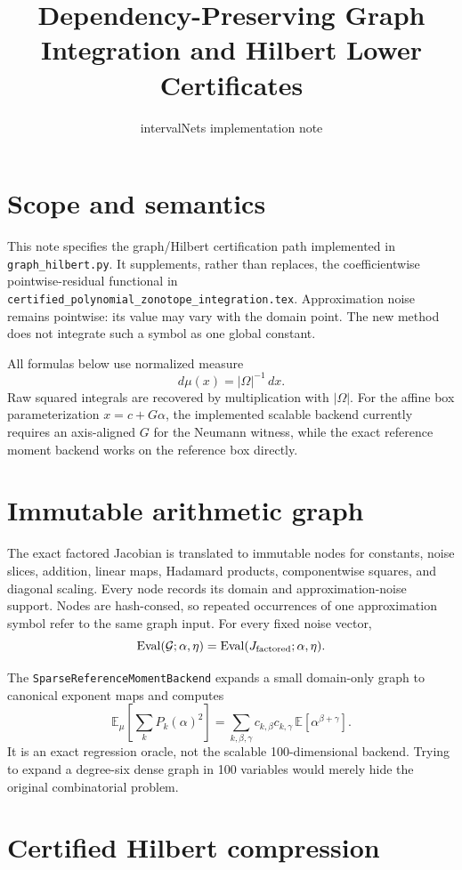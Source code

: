 \documentclass[11pt]{article}
\title{Dependency-Preserving Graph Integration and Hilbert Lower Certificates}
\author{intervalNets implementation note}
\date{}
\begin{document}
\maketitle

\section{Scope and semantics}

This note specifies the graph/Hilbert certification path implemented in
\texttt{graph\_hilbert.py}.  It supplements, rather than replaces, the
coefficientwise pointwise-residual functional in
\texttt{certified\_polynomial\_zonotope\_integration.tex}.  Approximation
noise remains pointwise: its value may vary with the domain point.  The new
method does not integrate such a symbol as one global constant.

All formulas below use normalized measure
\[
 d\mu(x)=|\Omega|^{-1}\,dx.
\]
Raw squared integrals are recovered by multiplication with \(|\Omega|\).
For the affine box parameterization \(x=c+G\alpha\), the implemented scalable
backend currently requires an axis-aligned \(G\) for the Neumann witness, while
the exact reference moment backend works on the reference box directly.

\section{Immutable arithmetic graph}

The exact factored Jacobian is translated to immutable nodes for constants,
noise slices, addition, linear maps, Hadamard products, componentwise squares,
and diagonal scaling.  Every node records its domain and approximation-noise
support.  Nodes are hash-consed, so repeated occurrences of one approximation
symbol refer to the same graph input.  For every fixed noise vector,
\[
 \operatorname{Eval}(\mathcal G;\alpha,\eta)
 =\operatorname{Eval}(J_{\rm factored};\alpha,\eta).
\]

The \texttt{SparseReferenceMomentBackend} expands a small domain-only graph to
canonical exponent maps and computes
\[
 \mathbb E_\mu\!\left[\sum_k P_k(\alpha)^2\right]
 =\sum_{k,\beta,\gamma}
 c_{k,\beta}c_{k,\gamma}\,
 \mathbb E[\alpha^{\beta+\gamma}].
\]
It is an exact regression oracle, not the scalable 100-dimensional backend.
Trying to expand a degree-six dense graph in 100 variables would merely hide
the original combinatorial problem.

\section{Certified Hilbert compression}
\end{document}
